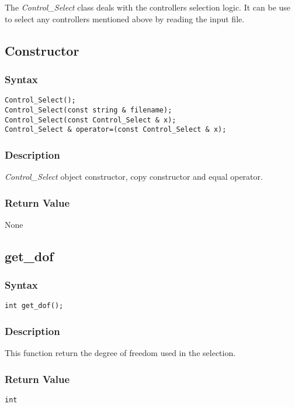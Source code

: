 \documentclass[11pt,fleqn,letterpaper]{report}
\begin{document}
The \emph{Control\_Select} class deals with the controllers
selection logic. It can be use to select any controllers mentioned
above by reading the input file.
\subsection*{Constructor}
\subsubsection*{Syntax}
\begin{verbatim}
Control_Select();
Control_Select(const string & filename);
Control_Select(const Control_Select & x);
Control_Select & operator=(const Control_Select & x);
\end{verbatim}

\subsubsection*{Description}   
\emph{Control\_Select} object constructor, copy constructor and equal
operator.

\subsubsection*{Return Value}

None

\newpage

\subsection*{get\_dof}
\subsubsection*{Syntax}
\begin{verbatim}
int get_dof();
\end{verbatim}

\subsubsection*{Description}   
This function return the degree of freedom used in the selection.
\subsubsection*{Return Value}

\texttt{int}

\newpage
\end{document}
